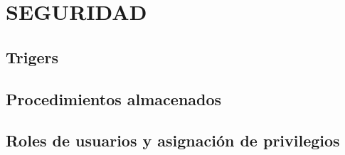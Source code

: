 \chapter*{SEGURIDAD}
\section{Trigers}
\section{Procedimientos almacenados}
\section{Roles de usuarios y asignación de privilegios}